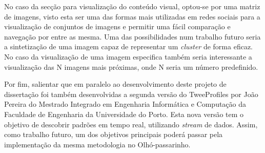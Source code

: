 \begin{description}
No caso da secção para visualização do conteúdo visual, optou-se por uma matriz de imagens, visto esta ser uma das formas mais utilizadas em redes sociais para a visualização de conjuntos de imagens e permitir uma fácil comparação e navegação por entre as mesma. 
Uma das possibilidades num trabalho futuro seria a sintetização de uma imagem capaz de representar um \textit{cluster} de forma eficaz. No caso da visualização de uma imagem especifica também seria interessante a visualização das N imagens mais próximas, onde N seria um número predefinido.

\end{description}

Por fim, salientar que em paralelo ao desenvolvimento deste projeto de dissertação foi também desenvolvidas a segunda versão do TweeProfiles por João Pereira do Mestrado Integrado em Engenharia Informática e Computação da Faculdade de Engenharia da Universidade do Porto. Esta nova versão tem o objetivo de descobrir padrões em tempo real, utilizando \textit{stream} de dados. Assim, como trabalho futuro, um dos objetivos principais poderá passar pela implementação da mesma metodologia no Olhó-passarinho.
